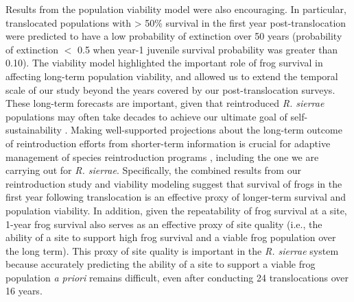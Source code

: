 \documentclass[
  letterpaper,
  DIV=11,
  numbers=noendperiod]{scrartcl}
\begin{document}
Results from the population viability model were also encouraging. In
particular, translocated populations with \textgreater{} 50\% survival
in the first year post-translocation were predicted to have a low
probability of extinction over 50 years (probability of extinction \(<\)
0.5 when year-1 juvenile survival probability was greater than 0.10).
The viability model highlighted the important role of frog survival in
affecting long-term population viability, and allowed us to extend the
temporal scale of our study beyond the years covered by our
post-translocation surveys. These long-term forecasts are important,
given that reintroduced \emph{R. sierrae} populations may often take
decades to achieve our ultimate goal of self-sustainability
\citep{joseph2018}. Making well-supported projections about the
long-term outcome of reintroduction efforts from shorter-term
information is crucial for adaptive management of species reintroduction
programs \citep{seddon2007}, including the one we are carrying out for
\emph{R. sierrae}. Specifically, the combined results from our
reintroduction study and viability modeling suggest that survival of
frogs in the first year following translocation is an effective proxy of
longer-term survival and population viability. In addition, given the
repeatability of frog survival at a site, 1-year frog survival also
serves as an effective proxy of site quality (i.e., the ability of a
site to support high frog survival and a viable frog population over the
long term). This proxy of site quality is important in the \emph{R.
sierrae} system because accurately predicting the ability of a site to
support a viable frog population \emph{a priori} remains difficult, even
after conducting 24 translocations over 16 years.
\end{document}
